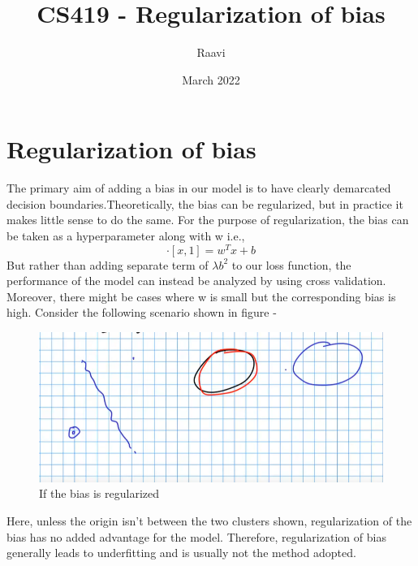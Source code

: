 \documentclass{article}
\title{CS419 - Regularization of bias}
\author{Raavi}
\date{March 2022}
\begin{document}
\maketitle

\section{Regularization of bias}
The primary aim of adding a bias in our model is to have clearly demarcated decision boundaries.Theoretically, the bias can be regularized, but in practice it makes little sense to do the same. For the purpose of regularization, the bias can be taken as a hyperparameter along with w i.e.,
\begin{equation}
    [w,b]\cdot[x,1] = w^Tx+b
\end{equation}
But rather than adding separate term of $\lambda b^2$ to our loss function, the performance of the model can instead be analyzed by using cross validation.\\
Moreover, there might be cases where w is small but the corresponding bias is high.
Consider the following scenario shown in figure - 
\newline
\begin{figure}
    \centering
    \includegraphics[scale = 0.5]{ifbregularise.png}
    \caption{If the bias is regularized}
\end{figure}
Here, unless the origin isn't between the two clusters shown, regularization of the bias has no added advantage for the model. Therefore, regularization of bias generally leads to underfitting and is usually not the method adopted.
\end{document}
